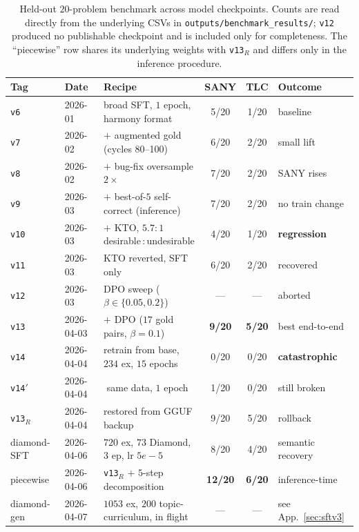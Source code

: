\documentclass[11pt]{article}
\begin{document}
\begin{table}[t]
\centering
\small
\begin{tabular}{l l l c c l}
\toprule
Tag & Date & Recipe & SANY & TLC & Outcome \\
\midrule
\texttt{v6}    & 2026-01    & broad SFT, $1$ epoch, harmony format               & 5/20 & 1/20 & baseline \\
\texttt{v7}    & 2026-02    & $+$ augmented gold (cycles 80--100)                & 6/20 & 2/20 & small lift \\
\texttt{v8}    & 2026-02    & $+$ bug-fix oversample $2\!\times$                 & 7/20 & 2/20 & SANY rises \\
\texttt{v9}    & 2026-03    & $+$ best-of-$5$ self-correct (inference)           & 7/20 & 2/20 & no train change \\
\texttt{v10}   & 2026-03    & $+$ KTO, $5.7\!:\!1$ desirable\,:\,undesirable     & 4/20 & 1/20 & \textbf{regression} \\
\texttt{v11}   & 2026-03    & KTO reverted, SFT only                             & 6/20 & 2/20 & recovered \\
\texttt{v12}   & 2026-03    & DPO sweep ($\beta\!\in\!\{0.05,0.2\}$)             & ---  & ---  & aborted \\
\texttt{v13}   & 2026-04-03 & $+$ DPO ($17$ gold pairs, $\beta=0.1$)             & \textbf{9/20} & \textbf{5/20} & best end-to-end \\
\texttt{v14}   & 2026-04-04 & retrain from base, $234$ ex, $15$ epochs           & 0/20 & 0/20 & \textbf{catastrophic} \\
\texttt{v14}$'$ & 2026-04-04 & $\!\!$ same data, $1$ epoch                       & 1/20 & 0/20 & still broken \\
\texttt{v13}$_R$ & 2026-04-04 & restored from GGUF backup                        & 9/20 & 5/20 & rollback \\
\midrule
diamond-SFT    & 2026-04-06 & $720$ ex, $73$ Diamond, $3$ ep, lr $5e\!-\!5$      & 8/20 & 4/20 & semantic recovery \\
piecewise      & 2026-04-06 & \texttt{v13}$_R$ $+$ $5$-step decomposition        & \textbf{12/20} & \textbf{6/20} & inference-time \\
diamond-gen    & 2026-04-07 & $1053$ ex, $200$ topic-curriculum, in flight       & ---  & ---  & see App.~\ref{sec:sftv3} \\
\bottomrule
\end{tabular}
\caption{Held-out $20$-problem benchmark across model checkpoints.
Counts are read directly from the underlying CSVs in
\texttt{outputs/benchmark\_results/}; \texttt{v12} produced no
publishable checkpoint and is included only for completeness. The
``piecewise'' row shares its underlying weights with \texttt{v13}$_R$
and differs only in the inference procedure.}
\label{tab:run-history}
\end{table}
\end{document}
